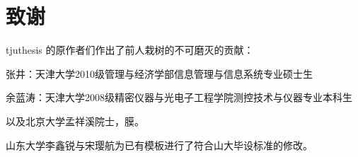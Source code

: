 \thispagestyle{fancy}

\chapter*{\xiaoer\hei\textbf{致\qquad\qquad 谢}} %


\begin{spacing}{1.5}
\xiaosi\song
tjuthesis 的原作者们作出了前人栽树的不可磨灭的贡献：

张井：天津大学2010级管理与经济学部信息管理与信息系统专业硕士生

余蓝涛：天津大学2008级精密仪器与光电子工程学院测控技术与仪器专业本科生

以及北京大学孟祥溪院士，膜。

山东大学李鑫锐与宋璎航为已有模板进行了符合山大毕设标准的修改。
\end{spacing}